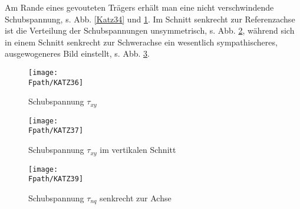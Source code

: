 Am Rande eines gevouteten Tr\"{a}gers erh\"{a}lt man eine nicht verschwindende Schubspannung, s. Abb. \ref{Katz34} und \ref{Katz36}. Im Schnitt senkrecht zur Referenzachse ist die Verteilung der Schubspannungen unsymmetrisch, s. Abb. \ref{Katz37}, w\"{a}hrend sich in einem Schnitt senkrecht zur Schwerachse ein wesentlich sympathischeres, ausgewogeneres Bild einstellt, s. Abb. \ref{Katz39}.
\begin{figure}[tbp] \centering
\if {} \sidecaption \fi
\texttt{[image: \\Fpath/KATZ36]}
\caption{Schubspannung $\tau_{xy}$}
\label{Katz36}%
\end{figure}%
\begin{figure}[tbp] \centering
\if {} \sidecaption \fi
\texttt{[image: \\Fpath/KATZ37]}
\caption{Schubspannung $\tau_{xy}$ im vertikalen Schnitt}
\label{Katz37}%
\end{figure}%

\begin{figure}[tbp] \centering
\if {} \sidecaption \fi
\texttt{[image: \\Fpath/KATZ39]}
\caption{Schubspannung $\tau_{nq}$ senkrecht zur Achse}
\label{Katz39}%
\end{figure}%

